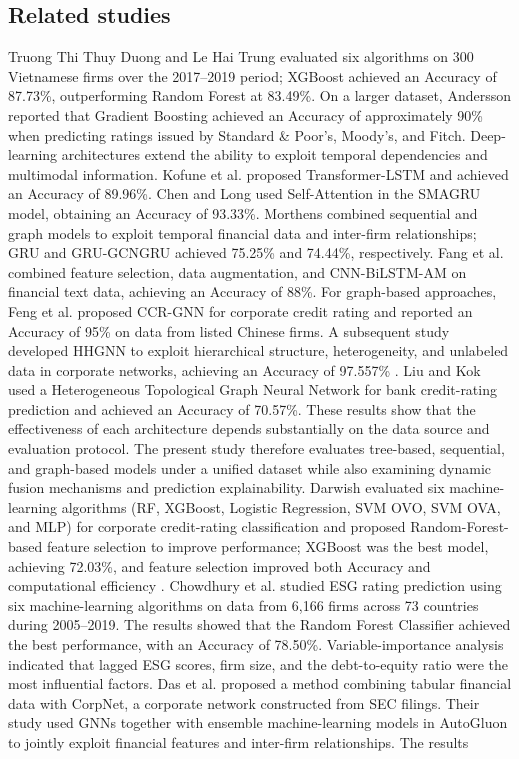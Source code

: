 \documentclass[10pt,twoside]{article}
\begin{document}
\subsection{Related studies}
Truong Thi Thuy Duong and Le Hai Trung \cite{thuy_ung_2023} evaluated six algorithms on 300 Vietnamese firms over the 2017--2019 period; XGBoost achieved an Accuracy of 87.73\%, outperforming Random Forest at 83.49\%. On a larger dataset, Andersson \cite{andersson_machine_2023} reported that Gradient Boosting achieved an Accuracy of approximately 90\% when predicting ratings issued by Standard \& Poor's, Moody's, and Fitch. Deep-learning architectures extend the ability to exploit temporal dependencies and multimodal information. Kofune et al. \cite{kofune_enhancing_2026} proposed Transformer-LSTM and achieved an Accuracy of 89.96\%. Chen and Long \cite{chen_novel_2020} used Self-Attention in the SMAGRU model, obtaining an Accuracy of 93.33\%. Morthens \cite{morthens_1989-_credit_2024} combined sequential and graph models to exploit temporal financial data and inter-firm relationships; GRU and GRU-GCNGRU achieved 75.25\% and 74.44\%, respectively. Fang et al. \cite{fang_design_2025} combined feature selection, data augmentation, and CNN-BiLSTM-AM on financial text data, achieving an Accuracy of 88\%. For graph-based approaches, Feng et al. \cite{feng_every_2020} proposed CCR-GNN for corporate credit rating and reported an Accuracy of 95\% on data from listed Chinese firms. A subsequent study developed HHGNN to exploit hierarchical structure, heterogeneity, and unlabeled data in corporate networks, achieving an Accuracy of 97.557\% \cite{feng_corporate_2024}. Liu and Kok \cite{liu_prediction_2025} used a Heterogeneous Topological Graph Neural Network for bank credit-rating prediction and achieved an Accuracy of 70.57\%. These results show that the effectiveness of each architecture depends substantially on the data source and evaluation protocol. The present study therefore evaluates tree-based, sequential, and graph-based models under a unified dataset while also examining dynamic fusion mechanisms and prediction explainability. Darwish evaluated six machine-learning algorithms (RF, XGBoost, Logistic Regression, SVM OVO, SVM OVA, and MLP) for corporate credit-rating classification and proposed Random-Forest-based feature selection to improve performance; XGBoost was the best model, achieving 72.03\%, and feature selection improved both Accuracy and computational efficiency \cite{darwish_optimization_2025}. Chowdhury et al. \cite{chowdhury_environmental_2023} studied ESG rating prediction using six machine-learning algorithms on data from 6,166 firms across 73 countries during 2005--2019. The results showed that the Random Forest Classifier achieved the best performance, with an Accuracy of 78.50\%. Variable-importance analysis indicated that lagged ESG scores, firm size, and the debt-to-equity ratio were the most influential factors. Das et al. \cite{das_credit_2023} proposed a method combining tabular financial data with CorpNet, a corporate network constructed from SEC filings. Their study used GNNs together with ensemble machine-learning models in AutoGluon to jointly exploit financial features and inter-firm relationships. The results 
\end{document}
